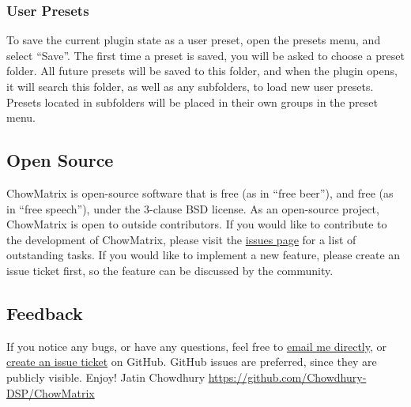 \documentclass[landscape,twocolumn,a5paper]{manual}
\begin{document}
\subsubsection{User Presets}
To save the current plugin state as a user preset, open
the presets menu, and select ``Save''. The first time a
preset is saved, you will be asked to choose a preset
folder. All future presets will be saved to this folder,
and when the plugin opens, it will search this folder, as
well as any subfolders, to load new user presets.
Presets located in subfolders will be placed in their
own groups in the preset menu.

\subsection{Open Source}
ChowMatrix is open-source software that is free (as in ``free
beer''), and free (as in ``free speech''), under the
3-clause BSD license.
\newpar
As an open-source project, ChowMatrix is
open to outside contributors. If you would like to contribute
to the development of ChowMatrix, please visit the
\href{https://github.com/Chowdhury-DSP/ChowMatrix/issues}{issues page}
for a list of outstanding tasks. If you would like to implement
a new feature, please create an issue ticket first, so the
feature can be discussed by the community.

\subsection{Feedback}
If you notice any bugs, or have any questions, feel free
to \href{mailto:chowdsp@gmail.com}{email me directly},
or \href{https://github.com/Chowdhury-DSP/ChowMatrix/issues}{create an issue ticket}
on GitHub. GitHub issues are preferred, since they are publicly
visible.
\newpar
Enjoy!
\newpar
Jatin Chowdhury
\newpar
\href{https://github.com/Chowdhury-DSP/ChowMatrix}{https://github.com/Chowdhury-DSP/ChowMatrix}

\newpage
\end{document}
